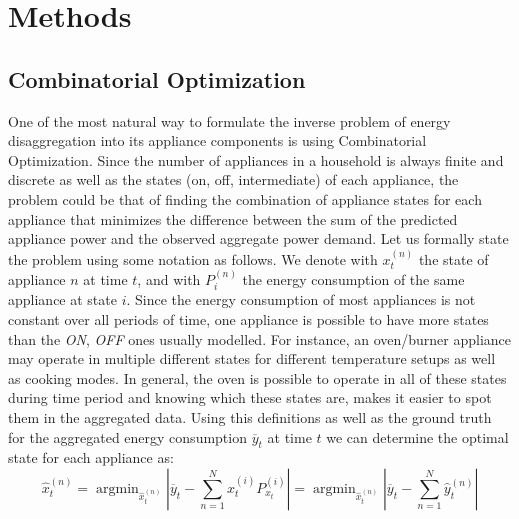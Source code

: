 \documentclass[10pt]{article}
\begin{document}
\section{Methods}


\subsection{Combinatorial Optimization}
\hspace{2ex} One of the most natural way to formulate the inverse problem of energy disaggregation into its appliance components is using Combinatorial Optimization. Since the number of appliances in a household is always finite and discrete as well as the states (on, off, intermediate) of each appliance, the problem could be that of finding the combination of appliance states for each appliance that minimizes the difference between the sum of the predicted appliance power and the observed aggregate power demand. Let us formally state the problem using some notation as follows. We denote with $x_t^{(n)}$ the state of appliance $n$ at time $t$, and with $P_{i}^{(n)}$ the energy  consumption of the same appliance at state $i$. Since the energy consumption of most appliances is not constant over all periods of time, one appliance is possible to have more states than the \textit{ON}, \textit{OFF} ones usually modelled. For instance, an oven/burner appliance may operate in multiple different states for different temperature setups as well as cooking modes. In general, the oven is possible to operate in all of these states during time period and knowing which these states are, makes it easier to spot them in the aggregated data. Using this definitions as well as the ground truth for the aggregated energy consumption $\overline{y}_t$ at time $t$ we can determine the optimal state for each appliance as:
%
\begin{equation}\label{CO_sol_1}
\hat{x}^{(n)}_t=\mathop{\mathrm{argmin}}_{\hat{x}^{(n)}_t}\left|\overline{y}_t-\sum_{n=1}^N{x_t^{(i)}P_{x_t}^{(i)}}\right|=\mathop{\mathrm{argmin}}_{\hat{x}^{(n)}_t}\left|\overline{y}_t-\sum_{n=1}^N{\hat{y}_t^{(n)}}\right|
\end{equation}
%
\end{document}
